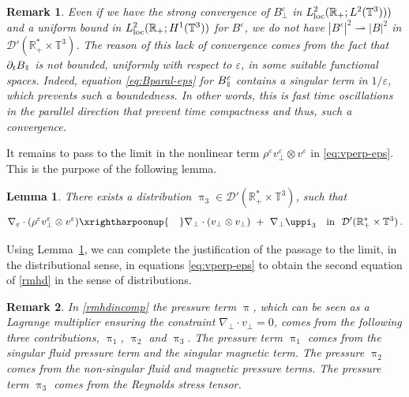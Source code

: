 \documentclass[11pt,reqno]{amsart}
\newtheorem{remark}{Remark}
\newtheorem{lemma}{Lemma}
\def \R{{\mathbb{R}}}
\def \T{{\mathbb{T}}}
\newcommand{\myparallel}{{\mkern3mu\vphantom{\perp}\vrule depth 0pt\mkern2mu\vrule depth 0pt\mkern3mu}}
\begin{document}
\begin{remark}
  Even if we have the strong convergence of $B_\perp^\varepsilon$ in $L_{\rm loc}^2(\R_+; L^2(\T^3)))$ and a uniform bound in $L_{\rm loc }^2(\R_+;H^1(\T^3))$ for $B^\varepsilon$, we do not have $|B^\varepsilon|^2\rightharpoonup |B|^2$ in $\mathcal D'(\R_+^*\times\T^3)$. The reason of this lack of convergence comes from  the fact that $\partial_t B_\myparallel $ is not bounded, uniformly with respect to $\varepsilon$, in some suitable functional spaces. Indeed, equation \eqref{eq:Bparal-eps} for $B_\myparallel^\varepsilon$ contains a singular term in $1/\varepsilon$, which prevents such a boundedness. In other words, this is  fast time oscillations in the parallel direction that prevent time compactness and thus, such a convergence. 
\end{remark}

It remains to pass to the limit in the nonlinear term $\rho^\varepsilon v_\perp^\varepsilon \otimes v^\varepsilon $ in \eqref{eq:vperp-eps}. This is the purpose of the following lemma.
\begin{lemma}
  \label{lem:RST} There exists a distribution $\uppi_3 \in \mathcal D'(\R_+^* \times \T^3)$, such that
  \begin{equation*}
    \nabla_\varepsilon \cdot (\rho^\varepsilon v_\perp^\varepsilon \otimes v^\varepsilon) \xrightharpoonup{\quad}
    \nabla_\perp \cdot ( v_\perp \otimes v_\perp)  \ + \ \nabla_\perp \uppi_3 \ \ \mbox{ in } \
    \mathcal{D}'(\R_+^*\times \T^3)\,.
   \end{equation*}
\end{lemma}

Using Lemma~\ref{lem:RST}, we can complete the justification of the passage to the limit, in the distributional sense, in equations  \eqref{eq:vperp-eps} to obtain the second equation of \eqref{rmhd} in the sense of distributions.

\begin{remark}
  In \eqref{rmhdincomp} the pressure term $\uppi$, which can be seen as a Lagrange multiplier ensuring the constraint $\nabla_\perp \cdot v_\perp=0$, comes from the following three contributions, $\uppi_1$, $\uppi_2$ and  $\uppi_3$. The pressure  term $\uppi_1$ comes from the singular fluid pressure term and the singular  magnetic term. The pressure $\uppi_2$ comes from the non-singular fluid and magnetic pressure terms. The pressure term $\uppi_3$ comes from the Reynolds stress tensor.
\end{remark}
\end{document}
